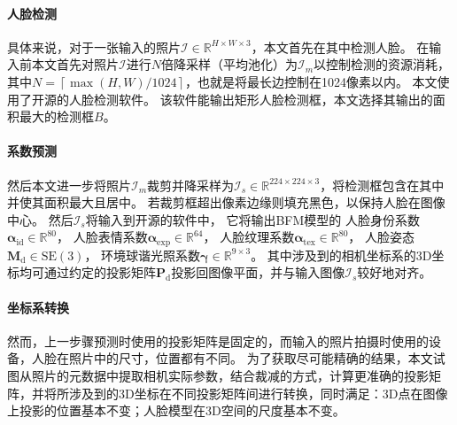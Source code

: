 \paragraph{人脸检测}
具体来说，对于一张输入的照片$\mathcal{I}\in\mathbb{R}^{H\times W\times 3}$，本文首先在其中检测人脸。
在输入前本文首先对照片$\mathcal{I}$进行$N$倍降采样（平均池化）为$\mathcal{I}_m$以控制检测的资源消耗，其中$N=\left\lceil \max(H, W) / 1024\right\rceil$，也就是将最长边控制在1024像素以内。
本文使用了\citet{SFD}开源的人脸检测软件。
该软件能输出矩形人脸检测框，本文选择其输出的面积最大的检测框$B$。

\paragraph{系数预测}
然后本文进一步将照片$\mathcal{I}_m$裁剪并降采样为$\mathcal{I}_s\in\mathbb{R}^{224\times 224\times 3}$，将检测框包含在其中并使其面积最大且居中。
若裁剪框超出像素边缘则填充黑色，以保持人脸在图像中心。
然后$\mathcal{I}_s$将输入到\citet{deep3d}开源的软件中，
它将输出BFM模型\citep{BFM}的
人脸身份系数$\mathbf{\alpha}_\mathrm{id}\in\mathbb{R}^{80}$，
人脸表情系数$\mathbf{\alpha}_\mathrm{exp}\in\mathbb{R}^{64}$，
人脸纹理系数$\mathbf{\alpha}_\mathrm{tex}\in\mathbb{R}^{80}$，
人脸姿态$\mathbf{M}_\mathrm{d}\in\mathrm{SE(3)}$，
环境球谐光照系数$\mathbf{\gamma}\in\mathbb{R}^{9\times 3}$。
其中涉及到的相机坐标系的3D坐标均可通过约定的投影矩阵$\mathbf{P}_\mathrm{d}$投影回图像平面，并与输入图像$\mathcal{I}_s$较好地对齐。

\paragraph{坐标系转换}
然而，上一步骤预测时使用的投影矩阵是固定的，而输入的照片拍摄时使用的设备，人脸在照片中的尺寸，位置都有不同。
为了获取尽可能精确的结果，本文试图从照片的元数据中提取相机实际参数，结合裁减的方式，计算更准确的投影矩阵，并将所涉及到的3D坐标在不同投影矩阵间进行转换，同时满足：3D点在图像上投影的位置基本不变；人脸模型在3D空间的尺度基本不变。

